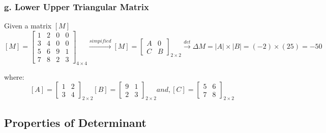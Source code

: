 \subsubsection*{g. Lower Upper Triangular Matrix}

Given a matrix $[M]$
$$  [M] = \begin{bmatrix}
    1 & 2 & 0 & 0 \\
    3 & 4 & 0 & 0 \\
    5 & 6 & 9 & 1 \\
    7 & 8 & 2 & 3
    \end{bmatrix}_{4 \times 4}
    \xrightarrow{simpified} [M] =  \begin{bmatrix}
    A & 0 \\
    C & B
    \end{bmatrix}_{2 \times 2}
    \xrightarrow{det} \Delta M = |A| \times |B| = (-2) \times (25) = -50
$$

where:
$$   [A] =  \begin{bmatrix}
    1 & 2 \\
    3 & 4
    \end{bmatrix}_{2 \times 2}
    [B] =  \begin{bmatrix}
    9 & 1 \\
    2 & 3
    \end{bmatrix}_{2 \times 2} and,
    [C] =  \begin{bmatrix}
    5 & 6 \\
    7 & 8
    \end{bmatrix}_{2 \times 2}
$$

\subsection{Properties of Determinant}

